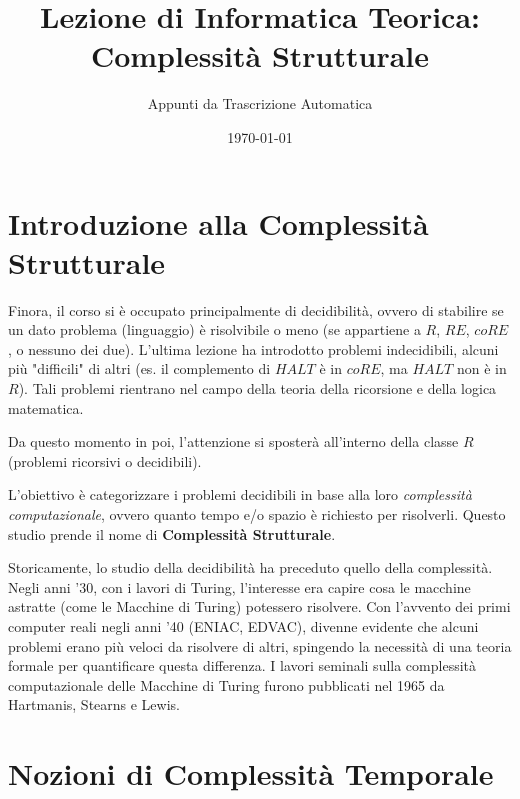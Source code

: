 \documentclass[a4paper]{article}
\title{Lezione di Informatica Teorica: Complessità Strutturale}
\author{Appunti da Trascrizione Automatica}
\date{\today}
\begin{document}
\maketitle
\tableofcontents
\newpage

\section{Introduzione alla Complessità Strutturale}

Finora, il corso si è occupato principalmente di decidibilità, ovvero di stabilire se un dato problema (linguaggio) è risolvibile o meno (se appartiene a $R$, $RE$, $coRE$, o nessuno dei due).
L'ultima lezione ha introdotto problemi indecidibili, alcuni più "difficili" di altri (es. il complemento di $HALT$ è in $coRE$, ma $HALT$ non è in $R$). Tali problemi rientrano nel campo della teoria della ricorsione e della logica matematica.

Da questo momento in poi, l'attenzione si sposterà all'interno della classe $R$ (problemi ricorsivi o decidibili).
\begin{center}
\end{center}
L'obiettivo è categorizzare i problemi decidibili in base alla loro \emph{complessità computazionale}, ovvero quanto tempo e/o spazio è richiesto per risolverli. Questo studio prende il nome di \textbf{Complessità Strutturale}.

Storicamente, lo studio della decidibilità ha preceduto quello della complessità. Negli anni '30, con i lavori di Turing, l'interesse era capire cosa le macchine astratte (come le Macchine di Turing) potessero risolvere. Con l'avvento dei primi computer reali negli anni '40 (ENIAC, EDVAC), divenne evidente che alcuni problemi erano più veloci da risolvere di altri, spingendo la necessità di una teoria formale per quantificare questa differenza.
I lavori seminali sulla complessità computazionale delle Macchine di Turing furono pubblicati nel 1965 da Hartmanis, Stearns e Lewis.

\section{Nozioni di Complessità Temporale}
\end{document}
